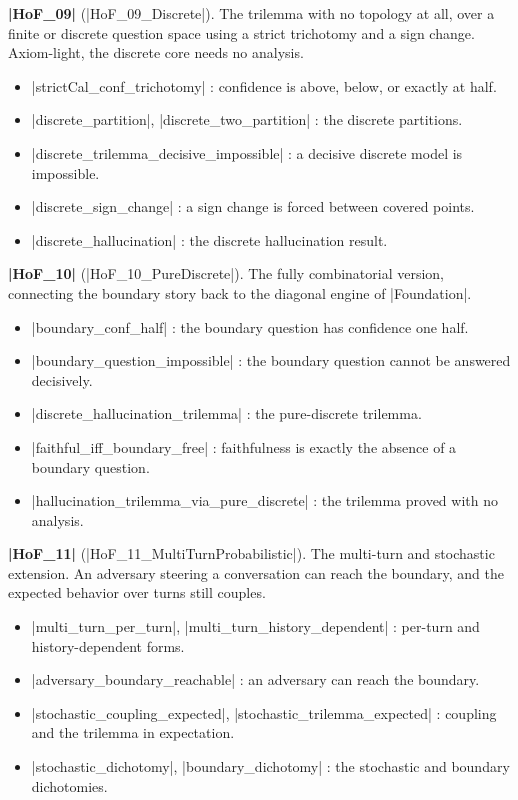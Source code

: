 \documentclass{memoir}
\begin{document}
\textbf{\LeanVerb|HoF_09|} (\LeanVerb|HoF_09_Discrete|). The trilemma with no topology at all, over a finite
or discrete question space using a strict trichotomy and a sign change. Axiom-light,
the discrete core needs no analysis.

\begin{itemize}
\item \LeanVerb|strictCal_conf_trichotomy| : confidence is above, below, or exactly at half.
\item \LeanVerb|discrete_partition|, \LeanVerb|discrete_two_partition| : the discrete partitions.
\item \LeanVerb|discrete_trilemma_decisive_impossible| : a decisive discrete model is
   impossible.
\item \LeanVerb|discrete_sign_change| : a sign change is forced between covered points.
\item \LeanVerb|discrete_hallucination| : the discrete hallucination result.

\end{itemize}


\textbf{\LeanVerb|HoF_10|} (\LeanVerb|HoF_10_PureDiscrete|). The fully combinatorial version, connecting the
boundary story back to the diagonal engine of \LeanVerb|Foundation|.

\begin{itemize}
\item \LeanVerb|boundary_conf_half| : the boundary question has confidence one half.
\item \LeanVerb|boundary_question_impossible| : the boundary question cannot be answered
   decisively.
\item \LeanVerb|discrete_hallucination_trilemma| : the pure-discrete trilemma.
\item \LeanVerb|faithful_iff_boundary_free| : faithfulness is exactly the absence of a boundary
   question.
\item \LeanVerb|hallucination_trilemma_via_pure_discrete| : the trilemma proved with no
   analysis.

\end{itemize}


\textbf{\LeanVerb|HoF_11|} (\LeanVerb|HoF_11_MultiTurnProbabilistic|). The multi-turn and stochastic
extension. An adversary steering a conversation can reach the boundary, and the
expected behavior over turns still couples.

\begin{itemize}
\item \LeanVerb|multi_turn_per_turn|, \LeanVerb|multi_turn_history_dependent| : per-turn and
   history-dependent forms.
\item \LeanVerb|adversary_boundary_reachable| : an adversary can reach the boundary.
\item \LeanVerb|stochastic_coupling_expected|, \LeanVerb|stochastic_trilemma_expected| : coupling and the
   trilemma in expectation.
\item \LeanVerb|stochastic_dichotomy|, \LeanVerb|boundary_dichotomy| : the stochastic and boundary
   dichotomies.

\end{itemize}
\end{document}
